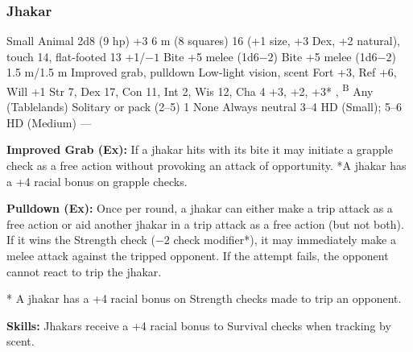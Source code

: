 \subsubsection{Jhakar}
\begin{MonsterStats}
{Small Animal}
{2d8 (9 hp)}
{+3}
{6 m (8 squares)}
{16 (+1 size, +3 Dex, +2 natural), touch 14, flat-footed 13}
{+1/$-1$}
{Bite +5 melee (1d6$-2$)}
{Bite +5 melee (1d6$-2$)}
{1.5 m/1.5 m}
{Improved grab, pulldown}
{Low-light vision, scent}
{Fort +3, Ref +6, Will +1}
{Str 7, Dex 17, Con 11, Int 2, Wis 12, Cha 4}
{ +3,  +2,  +3*}
{, \textsuperscript{B}}
{Any (Tablelands)}
{Solitary or pack (2--5)}
{1}
{None}
{Always neutral}
{3--4 HD (Small); 5--6 HD (Medium)}
{---}
\end{MonsterStats}


\textbf{Improved Grab (Ex):} If a jhakar hits with its bite it may initiate a grapple check as a free action without provoking an attack of opportunity. *A jhakar has a +4 racial bonus on grapple checks.

\textbf{Pulldown (Ex):} Once per round, a jhakar can either make a trip attack as a free action or aid another jhakar in a trip attack as a free action (but not both). If it wins the Strength check ($-2$ check modifier*), it may immediately make a melee attack against the tripped opponent. If the attempt fails, the opponent cannot react to trip the jhakar.

* A jhakar has a +4 racial bonus on Strength checks made to trip an opponent.

\textbf{Skills:} Jhakars receive a +4 racial bonus to Survival checks when tracking by scent.
